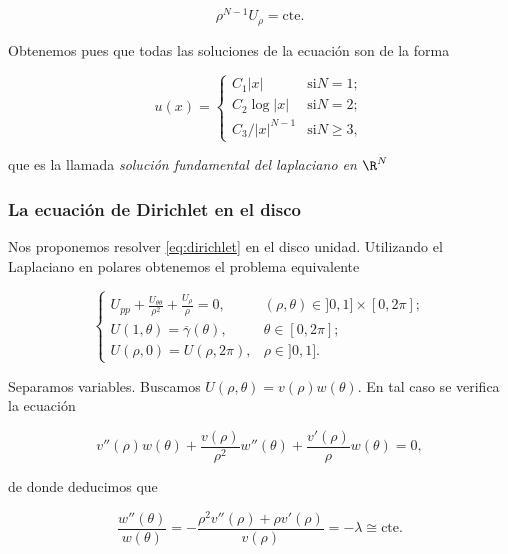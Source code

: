 \documentclass{article}
\begin{document}
\begin{equation}
  \label{eq:4}
  \rho^{N-1} U_{\rho} = \mathrm{cte}.
\end{equation}

Obtenemos pues que todas las soluciones de la ecuación son de la forma

\[ u(x) =
  \begin{cases}
    C_1 |x| & \text{si} N = 1; \\
    C_2 \log |x| & \text{si} N = 2; \\
    C_3 / |x|^{N-1} & \text{si} N \ge 3,
  \end{cases}
\]

que es la llamada \emph{solución fundamental del laplaciano en $\R^N$}

\subsubsection{La ecuación de Dirichlet en el disco}

Nos proponemos resolver \eqref{eq:dirichlet} en el disco unidad.  Utilizando el Laplaciano en polares obtenemos el problema equivalente

\begin{equation}
\label{eq:dirichlet:disco}
\begin{cases}
  U_{pp} + \frac{U_{\theta\theta}}{\rho^2} + \frac{U_{\rho}}{\rho} = 0, & (\rho, \theta) \in ]0,1]\times[0,2\pi]; \\
  U(1, \theta) = \overline{\gamma}(\theta), & \theta \in [0, 2\pi]; \\
  U(\rho, 0) = U(\rho, 2\pi), & \rho \in ]0, 1].
\end{cases}
\end{equation}

Separamos variables. Buscamos $U(\rho, \theta) = v(\rho) w(\theta)$.  En tal caso se verifica la ecuación

\begin{equation}
\label{eq:dirichlet:disco:sep}
v''(\rho) w(\theta) + \frac{v(\rho)}{\rho^2} w''(\theta) + \frac{v'(\rho)}{\rho}w(\theta) = 0,
\end{equation}

de donde deducimos que

\begin{equation}
  \label{eq:dirichlet:disco:sep:2}
  \frac{w''(\theta)}{w(\theta)} = -\frac{\rho^2 v''(\rho) + \rho v'(\rho)}{v(\rho)} = -\lambda \cong \mathrm{cte}.
\end{equation}
\end{document}
